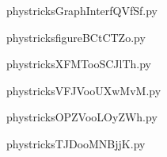     \newcommand{\CaptionFigGraphInterfQVfSf}{<+Type your caption here+>}
    \begin{center}
        
    \end{center}
    phystricksGraphInterfQVfSf.py

    

    \clearpage
    


    \newcommand{\CaptionFigfigureBCtCTZo}{<+Type your caption here+>}
    \begin{center}
        
    \end{center}
    phystricksfigureBCtCTZo.py

    

    \clearpage
    


    \newcommand{\CaptionFigXFMTooSCJlTh}{<+Type your caption here+>}
    \begin{center}
        
    \end{center}
    phystricksXFMTooSCJlTh.py

    

    \clearpage
    


    \newcommand{\CaptionFigVFJVooUXwMvM}{<+Type your caption here+>}
    \begin{center}
        
    \end{center}
    phystricksVFJVooUXwMvM.py

    

    \clearpage
    


    \newcommand{\CaptionFigOPZVooLOyZWh}{<+Type your caption here+>}
    \begin{center}
        
    \end{center}
    phystricksOPZVooLOyZWh.py

    

    \clearpage
    


    \newcommand{\CaptionFigTJDooMNBjjK}{<+Type your caption here+>}
    \begin{center}
        
    \end{center}
    phystricksTJDooMNBjjK.py

